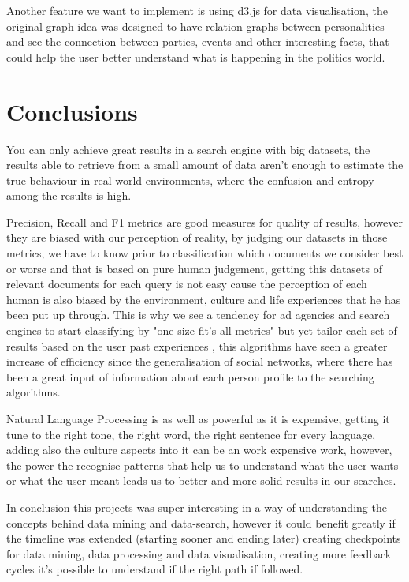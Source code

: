 \documentclass{acm_proc_article-sp}
\begin{document}
Another feature we want to implement is using d3.js for data visualisation, the original graph idea was designed to have relation graphs between personalities and see the connection between parties, events and other interesting facts, that could help the user better understand what is happening in the politics world.

\section{Conclusions}

You can only achieve great results in a search engine with big datasets, the results able to retrieve from a small amount of data aren't enough to estimate the true behaviour in real world environments, where the confusion and entropy among the results is high.

Precision, Recall and F1 metrics are good measures for quality of results, however they are biased with our perception of reality, by judging our datasets in those metrics, we have to know prior to classification which documents we consider best or worse and that is based on pure human judgement, getting this datasets of relevant documents for each query is not easy cause the perception of each human is also biased by the environment, culture and life experiences that he has been put up through. This is why we see a tendency for ad agencies and search engines to start classifying by "one size fit's all metrics" but yet tailor each set of results based on the user past experiences , this algorithms have seen a greater increase of efficiency since the generalisation of social networks, where there has been a great input of information about each person profile to the searching algorithms.

Natural Language Processing is as well as powerful as it is expensive, getting it tune to the right tone, the right word, the right sentence for every language, adding also the culture aspects into it can be an work expensive work, however, the power the recognise patterns that help us to understand what the user wants or what the user meant leads us to better and more solid results in our searches.

In conclusion this projects was super interesting in a way of understanding the concepts behind data mining and data-search, however it could benefit greatly if the timeline was extended (starting sooner and ending later) creating checkpoints for data mining, data processing and data visualisation, creating more feedback cycles it's possible to understand if the right path if followed.



\end{document}

